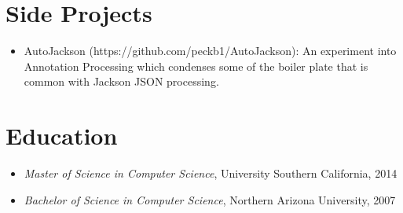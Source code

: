 \documentclass[11pt]{article}
\begin{document}
\section*{Side Projects}
\begin{itemize}
\item AutoJackson (https://github.com/peckb1/AutoJackson): An experiment into Annotation Processing which condenses some of the boiler plate that is common with Jackson JSON processing. 
\end{itemize}



\section*{Education}
\label{sec-4}

\begin{itemize}
\item \emph{Master of Science in Computer Science}, University Southern California, 2014
\item \emph{Bachelor of Science in Computer Science}, Northern Arizona University, 2007
\end{itemize}
\end{document}
